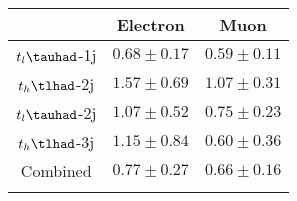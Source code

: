 \centering
\begin{tabular}{ccc} \toprule\toprule
 & Electron & Muon\\\midrule
$t_{l}\tauhad$-1j & $0.68\pm0.17$ & $0.59\pm0.11$\\
$t_{h}\tlhad$-2j & $1.57\pm0.69$ & $1.07\pm0.31$\\
$t_{l}\tauhad$-2j & $1.07\pm0.52$ & $0.75\pm0.23$\\
$t_{h}\tlhad$-3j & $1.15\pm0.84$ & $0.60\pm0.36$\\
Combined & $0.77\pm0.27$ & $0.66\pm0.16$\\
\bottomrule\bottomrule\\
\end{tabular}
